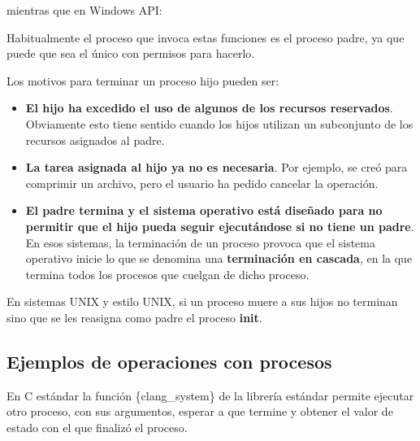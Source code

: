 mientras que en Windows API:

\begin{Shaded}
\begin{Highlighting}[]
\OperatorTok{(}\OperatorTok{);}
\end{Highlighting}
\end{Shaded}

Habitualmente el proceso que invoca estas funciones es el proceso padre,
ya que puede que sea el único con permisos para hacerlo.

Los motivos para terminar un proceso hijo pueden ser:

\begin{itemize}
\item
  \textbf{El hijo ha excedido el uso de algunos de los recursos
  reservados}. Obviamente esto tiene sentido cuando los hijos utilizan
  un subconjunto de los recursos asignados al padre.
\item
  \textbf{La tarea asignada al hijo ya no es necesaria}. Por ejemplo, se
  creó para comprimir un archivo, pero el usuario ha pedido cancelar la
  operación.
\item
  \textbf{El padre termina y el sistema operativo está diseñado para no
  permitir que el hijo pueda seguir ejecutándose si no tiene un padre}.
  En esos sistemas, la terminación de un proceso provoca que el sistema
  operativo inicie lo que se denomina una \textbf{{}terminación en
  cascada}, en la que termina todos los procesos que cuelgan de dicho
  proceso.
\end{itemize}

En sistemas UNIX y estilo UNIX, si un proceso muere a sus hijos no
terminan sino que se les reasigna como padre el proceso \textbf{init}.

\subsection{Ejemplos de operaciones con
procesos}\label{_ejemplos_de_operaciones_con_procesos}

En C estándar la función \{clang\_system\} de la librería estándar
permite ejecutar otro proceso, con sus argumentos, esperar a que termine
y obtener el valor de estado con el que finalizó el proceso.

\begin{Shaded}
\begin{Highlighting}[]
\OperatorTok{=}\OperatorTok{(}\OperatorTok{);}
\end{Highlighting}
\end{Shaded}

